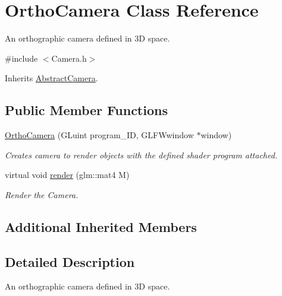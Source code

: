 \hypertarget{class_ortho_camera}{\section{Ortho\-Camera Class Reference}
\label{class_ortho_camera}
}


An orthographic camera defined in 3\-D space.  




{\ttfamily \#include $<$Camera.\-h$>$}



Inherits \hyperlink{class_abstract_camera}{Abstract\-Camera}.

\subsection*{Public Member Functions}
\begin{DoxyCompactItemize}
\item 
\hyperlink{class_ortho_camera_a1c452bfb01577c1aaed8b74ca3dc1916}{Ortho\-Camera} (G\-Luint program\-\_\-\-I\-D, G\-L\-F\-Wwindow $\ast$window)
\begin{DoxyCompactList}\small\item\em Creates camera to render objects with the defined shader program attached. \end{DoxyCompactList}\item 
virtual void \hyperlink{class_ortho_camera_a57f2d0c0ebd9a423c27794d7f9d4d96c}{render} (glm\-::mat4 M)
\begin{DoxyCompactList}\small\item\em Render the Camera. \end{DoxyCompactList}\end{DoxyCompactItemize}
\subsection*{Additional Inherited Members}


\subsection{Detailed Description}
An orthographic camera defined in 3\-D space. 

